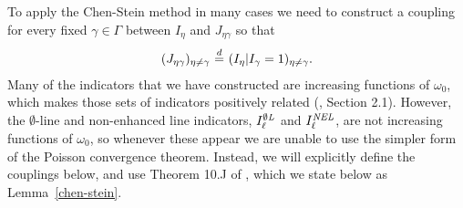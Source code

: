 \documentclass{amsart}
\newcommand{\deq}[0]{\ {\buildrel d \over =}\  }
\newcommand{\OL}{I^{\emptyset\text{\em L}}}
\newcommand{\NEL}{I^{\text{\em NEL}}}
\numberwithin{equation}{section}
\newcommand{\Ln}{\ell}
\theoremstyle{definition}
\theoremstyle{remark}
\begin{document}
To apply the Chen-Stein method in many cases we need to construct a coupling for every fixed $\gamma \in \Gamma$ between $I_\eta$ and $J_{\eta\gamma}$ so that
\begin{align}
\label{coupling}
(J_{\eta\gamma})_{\eta\neq \gamma} \deq (I_\eta | I_\gamma=1)_{\eta\neq\gamma}.
\end{align}
Many of the indicators that we have constructed are increasing functions of $\omega_0$, which makes those sets of indicators positively related (\cite{poissonbook}, Section 2.1).  However, the $\emptyset$-line and non-enhanced line indicators, $\OL_\Ln$ and $\NEL_\Ln$, are not increasing functions of $\omega_0$, so whenever these appear we are unable to use the simpler form of the Poisson convergence theorem.  Instead, we will explicitly define the couplings below, and use Theorem 10.J of \cite{poissonbook}, which we state below as Lemma~\ref{chen-stein}.
\end{document}
